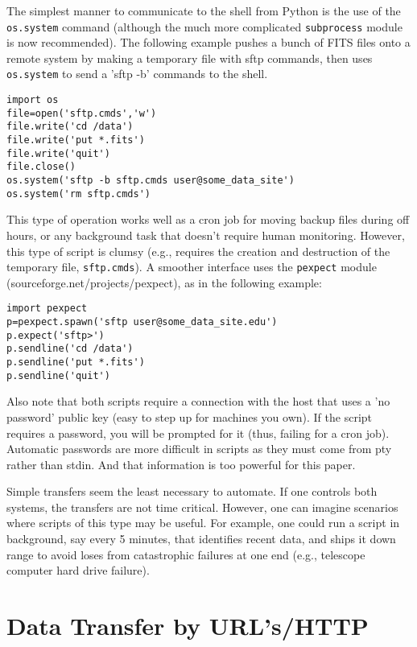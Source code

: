 \documentclass[11pt,preprint,graphicx]{aastex}
\begin{document}
\noindent The simplest manner to communicate to the shell from Python is
the use of the {\tt os.system} command (although the much more complicated
{\tt subprocess} module is now recommended).  The following example pushes
a bunch of FITS files onto a remote system by making a temporary file with
sftp commands, then uses {\tt os.system} to send a 'sftp -b' commands to
the shell.

\begin{verbatim}
import os
file=open('sftp.cmds','w')
file.write('cd /data')
file.write('put *.fits')
file.write('quit')
file.close()
os.system('sftp -b sftp.cmds user@some_data_site')
os.system('rm sftp.cmds')
\end{verbatim}

\noindent This type of operation works well as a cron job for moving backup
files during off hours, or any background task that doesn't require human
monitoring.  However, this type of script is clumsy (e.g., requires the
creation and destruction of the temporary file, {\tt sftp.cmds}).  A
smoother interface uses the {\tt pexpect} module
(sourceforge.net/projects/pexpect), as in the following example:

\begin{verbatim}
import pexpect
p=pexpect.spawn('sftp user@some_data_site.edu')
p.expect('sftp>')
p.sendline('cd /data')
p.sendline('put *.fits')
p.sendline('quit')
\end{verbatim}

\noindent Also note that both scripts require a connection with the host
that uses a 'no password' public key (easy to step up for machines you
own).  If the script requires a password, you will be prompted for it
(thus, failing for a cron job).  Automatic passwords are more difficult in
scripts as they must come from pty rather than stdin.  And that information
is too powerful for this paper.

\noindent Simple transfers seem the least necessary to automate.  If one
controls both systems, the transfers are not time critical.  However, one
can imagine scenarios where scripts of this type may be useful.  For
example, one could run a script in background, say every 5 minutes, that
identifies recent data, and ships it down range to avoid loses from
catastrophic failures at one end (e.g., telescope computer hard drive
failure).

\section{Data Transfer by URL's/HTTP}
\end{document}
